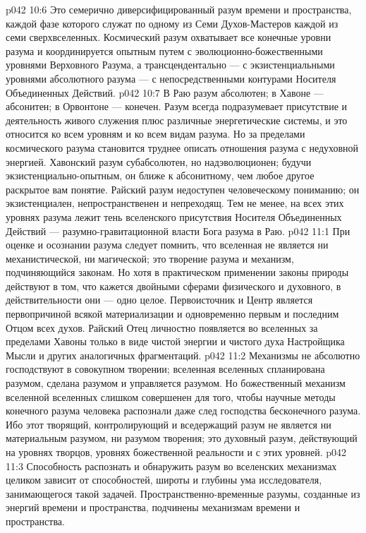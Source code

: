 \vs p042 10:6 \pc {}\bibnobreakspace {} Это семерично диверсифицированный разум времени и пространства, каждой фазе которого служат по одному из Семи Духов\hyp{}Мастеров каждой из семи сверхвселенных. Космический разум охватывает все конечные уровни разума и координируется опытным путем с эволюционно\hyp{}божественными уровнями Верховного Разума, а трансцендентально --- с экзистенциальными уровнями абсолютного разума --- с непосредственными контурами Носителя Объединенных Действий.
\vs p042 10:7 В Раю разум абсолютен; в Хавоне --- абсонитен; в Орвонтоне --- конечен. Разум всегда подразумевает присутствие и деятельность живого служения плюс различные энергетические системы, и это относится ко всем уровням и ко всем видам разума. Но за пределами космического разума становится труднее описать отношения разума с недуховной энергией. Хавонский разум субабсолютен, но надэволюционен; будучи экзистенциально\hyp{}опытным, он ближе к абсонитному, чем любое другое раскрытое вам понятие. Райский разум недоступен человеческому пониманию; он экзистенциален, непространственен и непреходящ. Тем не менее, на всех этих уровнях разума лежит тень вселенского присутствия Носителя Объединенных Действий --- разумно\hyp{}гравитационной власти Бога разума в Раю.
\vs p042 11:1 При оценке и осознании разума следует помнить, что вселенная не является ни механистической, ни магической; это творение разума и механизм, подчиняющийся законам. Но хотя в практическом применении законы природы действуют в том, что кажется двойными сферами физического и духовного, в действительности они --- одно целое. Первоисточник и Центр является первопричиной всякой материализации и одновременно первым и последним Отцом всех духов. Райский Отец личностно появляется во вселенных за пределами Хавоны только в виде чистой энергии и чистого духа Настройщика Мысли и других аналогичных фрагментаций.
\vs p042 11:2 \pc Механизмы не абсолютно господствуют в совокупном творении; вселенная вселенных  спланирована разумом, сделана разумом и управляется разумом. Но божественный механизм вселенной вселенных слишком совершенен для того, чтобы научные методы конечного разума человека распознали даже след господства бесконечного разума. Ибо этот творящий, контролирующий и вседержащий разум не является ни материальным разумом, ни разумом творения; это духовный разум, действующий на уровнях творцов, уровнях божественной реальности и с этих уровней.
\vs p042 11:3 Способность распознать и обнаружить разум во вселенских механизмах целиком зависит от способностей, широты и глубины ума исследователя, занимающегося такой задачей. Пространственно\hyp{}временные разумы, созданные из энергий времени и пространства, подчинены механизмам времени и пространства.
